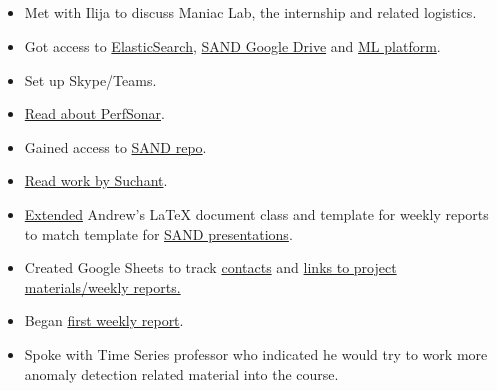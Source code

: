 \documentclass{weeklyreport}
\begin{document}
\subsection*{}

\begin{itemize}
    \item Met with Ilija to discuss Maniac Lab, the internship and related logistics.
    \item Got access to \href{https://atlas-kibana.mwt2.org:5601/}{ElasticSearch}, \href{https://drive.google.com/drive/folders/0APwP9-3JRjJOUk9PVA}{SAND Google Drive} and \href{https://codas.slateci.net/}{ML platform}.
    \item Set up Skype/Teams.
    \item \href{https://www.perfsonar.net/gtk_whatis.html}{Read about PerfSonar}.
    \item Gained access to \href{https://github.com/sand-ci}{SAND repo}.
    \item \href{https://drive.google.com/drive/folders/1ZzW0BQPzTr9K8w6xkqn9nV30oujFnreY?usp=sharing}{Read work by Suchant}.
    \item \href{https://www.overleaf.com/8647266712ttkyxfphmtvs}{Extended} Andrew's LaTeX document class and template for weekly reports to match template for \href{https://docs.google.com/presentation/d/1365SqaZjqrHnvYllhBcr7Z5zbP8dROKZKhFcWhOSFcE/edit?usp=sharing}{SAND presentations}.
    \item Created Google Sheets to track \href{https://docs.google.com/spreadsheets/d/1U9Ghphh7MsT3pbLcKU-PBj55ZeDankkhyYzn-XMLRMw/edit?usp=sharing}{contacts} and \href{https://docs.google.com/spreadsheets/d/10iPIfkq8TFPfNK93lgzEhBOzboEUTsx34XXU0fODKdk/edit?usp=sharing}{links to project materials/weekly reports.}
    \item Began \href{https://www.overleaf.com/2136625242fmfmybmnxbsh
}{first weekly report}.
    \item Spoke with Time Series professor who indicated he would try to work more anomaly detection related material into the course.
\end{itemize}

\subsection*{}
\end{document}
